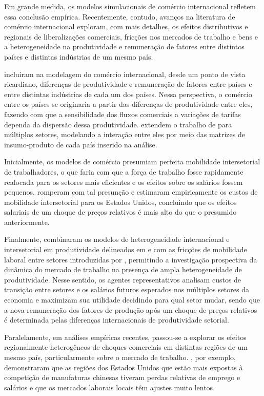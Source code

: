 \documentclass{article}
\begin{document}
Em grande medida, os modelos simulacionais de comércio internacional refletem essa conclusão empírica. Recentemente, contudo, avanços na literatura de comércio internacional exploram, com mais detalhes, os efeitos distributivos e regionais de liberalizações comerciais, fricções nos mercados de trabalho e bens e a heterogeneidade na produtividade e remuneração de fatores entre distintos países e distintas indústrias de um mesmo país.

\textcite{EatonKortum} incluíram na modelagem do comércio internacional, desde um ponto de vista ricardiano, diferenças de produtividade e remuneração de fatores entre países e entre distintas indústrias de cada um dos países. Nessa perspectiva, o comércio entre os países se originaria a partir das diferenças de produtividade entre eles, fazendo com que a sensibilidade dos fluxos comerciais a variações de tarifas dependa da dispersão dessa produtividade. \textcite{CaliendoParro} extendem o trabalho de \textcite{EatonKortum} para múltiplos setores, modelando a interação entre eles por meio das matrizes de insumo-produto de cada país inserido na análise.

Inicialmente, os modelos de comércio presumiam perfeita mobilidade intersetorial de trabalhadores, o que faria com que a força de trabalho fosse rapidamente realocada para os setores mais eficientes e os efeitos sobre os salários fossem pequenos. \textcite{artuc} romperam com tal presunção e estimaram empiricamente os custos de mobilidade intersetorial para os Estados Unidos, concluindo que os efeitos salariais de um choque de preços relativos é mais alto do que o presumido anteriormente.

Finalmente, \textcite{caliendo} combinaram os modelos de heterogeneidade internacional e intersetorial em produtividade delineados em \textcite{CaliendoParro} e \textcite{EatonKortum} com as fricções de mobilidade laboral entre setores introduzidas por \textcite{artuc}, permitindo a investigação prospectiva da dinâmica do mercado de trabalho na presença de ampla heterogeneidade de produtividade. Nesse sentido, os agentes representativos analisam custos de transição entre setores e os salários futuros esperados nos múltiplos setores da economia e maximizam sua utilidade decidindo para qual setor mudar, sendo que a nova remuneração dos fatores de produção após um choque de preços relativos é determinada pelas diferenças internacionais de produtividade setorial.

Paralelamente, em análises empíricas recentes, passou-se a  explorar os efeitos regionalmente heterogêneos de choques comerciais em distintas regiões de um mesmo país, particularmente sobre o mercado de trabalho. \textcite{AutorDornHanson}, por exemplo, demonstraram que as regiões dos Estados Unidos que estão mais expostas à competição de manufaturas chinesas tiveram perdas relativas de emprego e salários \textemdash e que os mercados laborais locais têm ajustes muito lentos.
\end{document}
